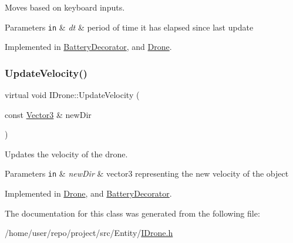 Moves based on keyboard inputs. 


\begin{DoxyParams}[1]{Parameters}
\mbox{\tt in}  & {\em dt} & period of time it has elapsed since last update \\
\hline
\end{DoxyParams}


Implemented in \hyperlink{classBatteryDecorator_a45babf9bc5484acb95701d361e89de9b}{Battery\+Decorator}, and \hyperlink{classDrone_aabfc6155cd0b8e14ae77c4659c090185}{Drone}.

\mbox{\label{classIDrone_a5cc88b8205adaeea8f71c822d08e1607}} 
\subsubsection{\texorpdfstring{Update\+Velocity()}{UpdateVelocity()}}
{\footnotesize\ttfamily virtual void I\+Drone\+::\+Update\+Velocity (\begin{DoxyParamCaption}\item[{const \hyperlink{classVector3}{Vector3} \&}]{new\+Dir }\end{DoxyParamCaption})\hspace{0.3cm}{\ttfamily [pure virtual]}}



Updates the velocity of the drone. 


\begin{DoxyParams}[1]{Parameters}
\mbox{\tt in}  & {\em new\+Dir} & vector3 representing the new velocity of the object \\
\hline
\end{DoxyParams}


Implemented in \hyperlink{classDrone_a8ecc9a70f1d3907a79be433bfa9b5d68}{Drone}, and \hyperlink{classBatteryDecorator_aad635fd483288cdcc46892da5265ca49}{Battery\+Decorator}.



The documentation for this class was generated from the following file\+:\begin{DoxyCompactItemize}
\item 
/home/user/repo/project/src/\+Entity/\hyperlink{IDrone_8h}{I\+Drone.\+h}\end{DoxyCompactItemize}
